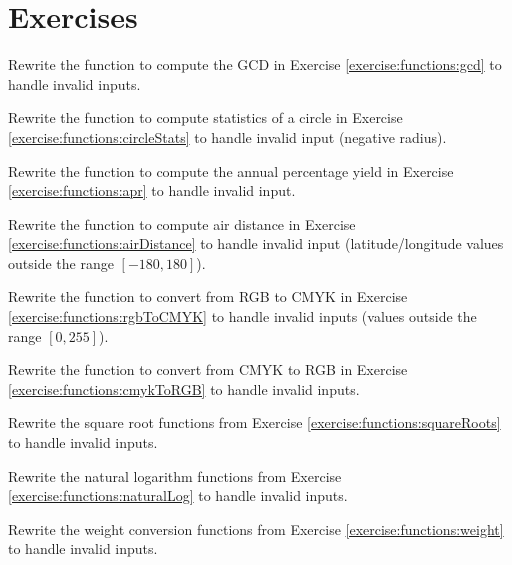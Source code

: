 

\section{Exercises}

\begin{exer}
Rewrite the function to compute the GCD in Exercise \ref{exercise:functions:gcd}
to handle invalid inputs.
\end{exer}

\begin{exer}
Rewrite the function to compute statistics of a circle in Exercise \ref{exercise:functions:circleStats}
to handle invalid input (negative radius).
\end{exer}

\begin{exer}
Rewrite the function to compute the annual percentage yield in Exercise \ref{exercise:functions:apr}
to handle invalid input.
\end{exer}

\begin{exer}
Rewrite the function to compute air distance in Exercise \ref{exercise:functions:airDistance}
to handle invalid input (latitude/longitude values outside the range $[-180, 180]$).
\end{exer}

\begin{exer}
Rewrite the function to convert from RGB to CMYK in Exercise \ref{exercise:functions:rgbToCMYK}
to handle invalid inputs (values outside the range $[0, 255]$).
\end{exer}

\begin{exer}
Rewrite the function to convert from CMYK to RGB in Exercise \ref{exercise:functions:cmykToRGB}
to handle invalid inputs.
\end{exer}

\begin{exer}
Rewrite the square root functions from Exercise \ref{exercise:functions:squareRoots}
to handle invalid inputs.
\end{exer}

\begin{exer}
Rewrite the natural logarithm functions from Exercise \ref{exercise:functions:naturalLog}
to handle invalid inputs.
\end{exer}

\begin{exer}
Rewrite the weight conversion functions from Exercise \ref{exercise:functions:weight}
to handle invalid inputs.
\end{exer}

